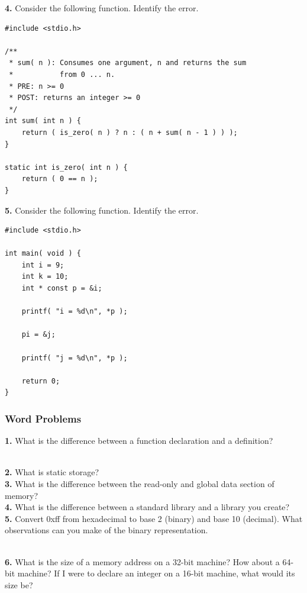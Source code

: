 \documentclass[12pt,extarticle]{article}
\begin{document}
\noindent
\textbf{4.} Consider the following function. Identify the error.\\

\lstset {
	language=c
}
\begin{lstlisting}
#include <stdio.h>

/**
 * sum( n ): Consumes one argument, n and returns the sum
 *           from 0 ... n.
 * PRE: n >= 0
 * POST: returns an integer >= 0
 */
int sum( int n ) {
	return ( is_zero( n ) ? n : ( n + sum( n - 1 ) ) );
}

static int is_zero( int n ) {
	return ( 0 == n );
}
\end{lstlisting}

\noindent
\textbf{5.} Consider the following function. Identify the error.\\

\lstset {
	language=c
}
\begin{lstlisting}
#include <stdio.h>

int main( void ) {
	int i = 9;
	int k = 10;
	int * const p = &i;
	
	printf( "i = %d\n", *p );
	
	pi = &j;
	
	printf( "j = %d\n", *p );
	
	return 0;
}
\end{lstlisting}

\subsubsection{Word Problems}

\textbf{1.} What is the difference between a function declaration and a definition?

~\\
\noindent
\textbf{2.} What is static storage?\\

\noindent
\textbf{3.} What is the difference between the read-only and global data section of memory?\\

\noindent
\textbf{4.} What is the difference between a standard library and a library you create?\\

\noindent
\textbf{5.} Convert 0xff from hexadecimal to base 2 (binary) and base 10 (decimal). What observations can you make of the binary representation.

~\\
\noindent
\textbf{6.} What is the size of a memory address on a 32-bit machine? How about a 64-bit machine? If I were to declare an integer on a 16-bit machine, what would its size be?\\
\end{document}
